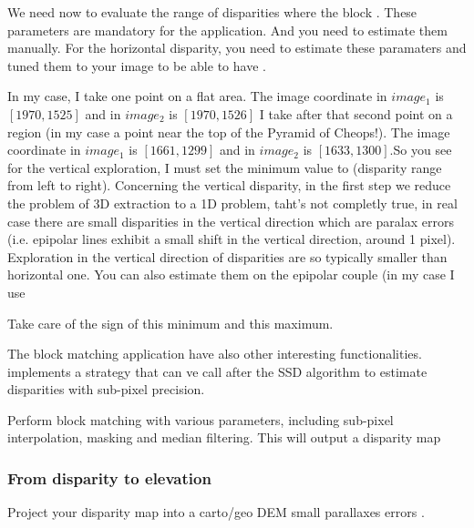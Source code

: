 We need now to evaluate the range of disparities where the block . These parameters are mandatory for the application. And you need to estimate them manually. For the horizontal disparity, you need to estimate these paramaters and tuned them to your image to be able to have .

In my case, I take one point on a flat area. The image coordinate in $image_{1}$ is $[1970,1525]$ and in $image_{2}$ is $[1970,1526]$
I take after that second point on a region (in my case a point near the top of the Pyramid of Cheops!). The image coordinate in $image_{1}$ is $[1661,1299]$ and in $image_{2}$ is $[1633,1300]$.So you see for the vertical exploration, I must set the minimum value to (disparity range from left to right). Concerning the vertical disparity, in the first step we reduce the problem of 3D extraction to a 1D problem, taht's not completly true, in real case there are small disparities in the vertical direction which are paralax errors (i.e. epipolar lines exhibit a small shift in the vertical direction, around 1 pixel). Exploration in the vertical direction of disparities are so typically smaller than horizontal one. You can also estimate them on the epipolar couple (in my case I use

Take care of the sign of this minimum and this maximum.

The block matching application have also other interesting functionalities. \otb implements a strategy that can ve call after the SSD algorithm to estimate disparities with sub-pixel precision.

Perform block matching with various parameters, including sub-pixel interpolation, masking and median filtering. This will output a disparity map
\subsubsection{From disparity to elevation}
Project your disparity map into a carto/geo DEM
small parallaxes errors .
